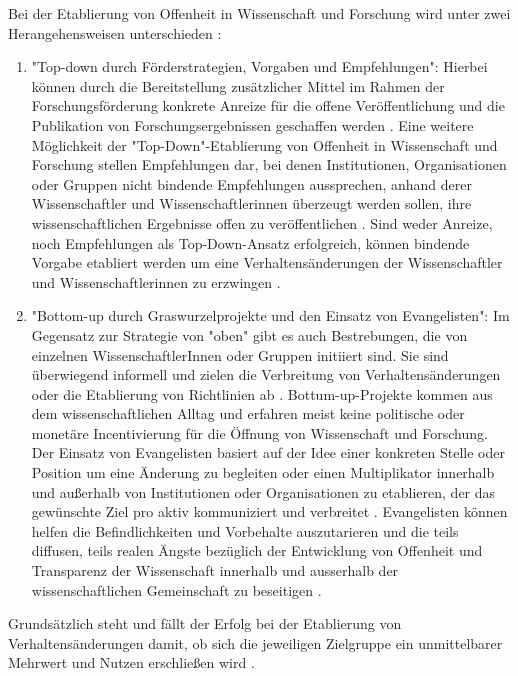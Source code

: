 Bei der Etablierung von Offenheit in Wissenschaft und Forschung wird unter zwei Herangehensweisen unterschieden \cite{schulze_2013_open}:
\begin{enumerate}
\item "Top-down durch Förderstrategien, Vorgaben und Empfehlungen": Hierbei können durch die Bereitstellung zusätzlicher Mittel im Rahmen der Forschungsförderung konkrete Anreize für die offene Veröffentlichung und die Publikation von Forschungsergebnissen geschaffen werden \cite{suchen}. Eine weitere Möglichkeit der "Top-Down"-Etablierung von Offenheit in Wissenschaft und Forschung stellen Empfehlungen dar, bei denen Institutionen, Organisationen oder Gruppen nicht bindende Empfehlungen aussprechen, anhand derer Wissenschaftler und Wissenschaftlerinnen überzeugt werden sollen, ihre wissenschaftlichen Ergebnisse offen zu veröffentlichen \cite{suchen}. Sind weder Anreize, noch Empfehlungen als Top-Down-Ansatz erfolgreich, können bindende Vorgabe etabliert werden um eine Verhaltensänderungen der Wissenschaftler und Wissenschaftlerinnen zu erzwingen \cite{suchen}.
\item "Bottom-up durch Graswurzelprojekte und den Einsatz von Evangelisten":
Im Gegensatz zur Strategie von "oben" gibt es auch Bestrebungen, die von einzelnen WissenschaftlerInnen oder Gruppen initiiert sind. Sie sind überwiegend informell und zielen die Verbreitung von Verhaltensänderungen oder die Etablierung von Richtlinien ab \cite{suchen}. Bottum-up-Projekte kommen aus dem wissenschaftlichen Alltag und erfahren meist keine politische oder monetäre Incentivierung für die Öffnung von Wissenschaft und Forschung. Der Einsatz von Evangelisten basiert auf der Idee einer konkreten Stelle oder Position um eine Änderung zu begleiten \cite{suchen} oder einen Multiplikator innerhalb und außerhalb von Institutionen oder Organisationen zu etablieren, der das gewünschte Ziel pro aktiv kommuniziert und verbreitet \cite{suchen}. Evangelisten können helfen die Befindlichkeiten und Vorbehalte auszutarieren und die teils diffusen, teils realen Ängste bezüglich der Entwicklung von Offenheit und Transparenz der Wissenschaft innerhalb und ausserhalb der wissenschaftlichen Gemeinschaft zu beseitigen \cite{schulze_2013_open}.
\end{enumerate}

Grundsätzlich steht und fällt der Erfolg bei der Etablierung von Verhaltensänderungen damit, ob sich die jeweiligen Zielgruppe ein unmittelbarer Mehrwert und Nutzen erschließen wird \cite{schulze_2013_open}.

